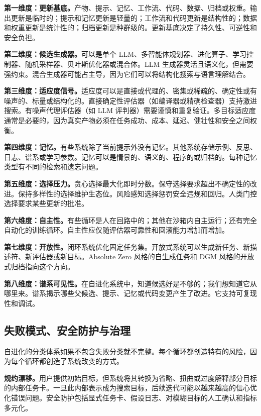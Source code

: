 \textbf{第一维度：更新基底。}产物、提示、记忆、工作流、代码、数据、归档或权重。输出更新是临时的；提示和记忆更新是轻量的；工作流和代码更新是结构性的；数据和权重更新是统计性的；归档更新是种群级的。更新基底决定了持久性、可逆性和安全负担。

\textbf{第二维度：候选生成器。}可以是单个 LLM、多智能体规划器、进化算子、学习控制器、随机采样器、贝叶斯优化器或混合体。LLM 生成器灵活且语义化，但需要强约束。混合生成器可能占主导，因为它们可以将结构化搜索与语言理解结合。

\textbf{第三维度：适应度信号。}适应度可以是直接或代理的、密集或稀疏的、确定性或有噪声的、标量或结构化的。直接确定性评估器（如编译器或精确检查器）支持激进搜索。有噪声代理评估器（如 LLM 评判器）需要谨慎和重复验证。多目标适应度通常是必要的，因为真实产物必须在任务成功、成本、延迟、健壮性和安全之间权衡。

\textbf{第四维度：记忆。}有些系统除了当前提示外没有记忆。其他系统存储示例、反思、日志、谱系或学习参数。记忆可以是情景的、语义的、程序的或归档的。每种记忆类型有不同的检索和遗忘问题。

\textbf{第五维度：选择压力。}贪心选择最大化即时分数。保守选择要求超出不确定性的改进。保持多样性的选择维护生态位。风险感知选择惩罚安全违规和回归。人类门控选择要求某些更新的批准。

\textbf{第六维度：自主性。}有些循环是人在回路中的；其他在沙箱内自主运行；还有完全自动化的训练循环。自主性应仅随评估器可靠性和回滚能力增加而增加。

\textbf{第七维度：开放性。}闭环系统优化固定任务集。开放式系统可以生成新任务、新描述符、新评估器或新目标。Absolute Zero 风格的自生成任务和 DGM 风格的开放式归档指向这个方向。

\textbf{第八维度：谱系可见性。}在自进化系统中，知道候选好是不够的；我们想知道它从哪里来。谱系揭示哪些父候选、提示、记忆或代码变更产生了改进。它支持可复现性和调试。

\subsection{失败模式、安全防护与治理}\label{sec:ch2-failure-governance}

自进化的分类体系如果不包含失败分类就不完整。每个循环都创造特有的风险，因为每个循环都创造了系统改变的方式。

\textbf{规约漂移。}用户提供初始目标，但系统将其转换为省略、扭曲或过度解释部分目标的内部任务卡。一旦此内部表示成为搜索目标，后续迭代可能以越来越高的信心优化错误问题。安全防护包括显式任务卡、假设日志、对模糊目标的人工确认和指标多元化。

